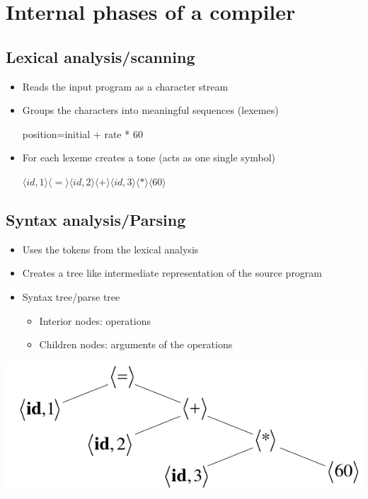 \documentclass{article}[18pt]
\begin{document}
\section{Internal phases of a compiler}
\subsection{Lexical analysis/scanning}
\begin{itemize}
	\item Reads the input program as a character stream
	\item Groups the characters into meaningful sequences (lexemes)
	\begin{center}
		position=initial + rate * 60
	\end{center}
	\item For each lexeme creates a tone (acts as one single symbol)
	\begin{center}
		$\langle id,1\rangle \langle = \rangle \langle id,2 \rangle \langle + \rangle \langle id,3 \rangle \langle * \rangle \langle 60 \rangle$
	\end{center}
\end{itemize}
\subsection{Syntax analysis/Parsing}
\begin{itemize}
	\item Uses the tokens from the lexical analysis
	\item Creates a tree like intermediate representation of the source program
	\item Syntax tree/parse tree
	\begin{itemize}
		\item Interior nodes: operations
		\item Children nodes: arguments of the operations
	\end{itemize}
\end{itemize}
\begin{center}
	\includegraphics[scale=0.5]{"Parse Tree"}
\end{center}
\end{document}
